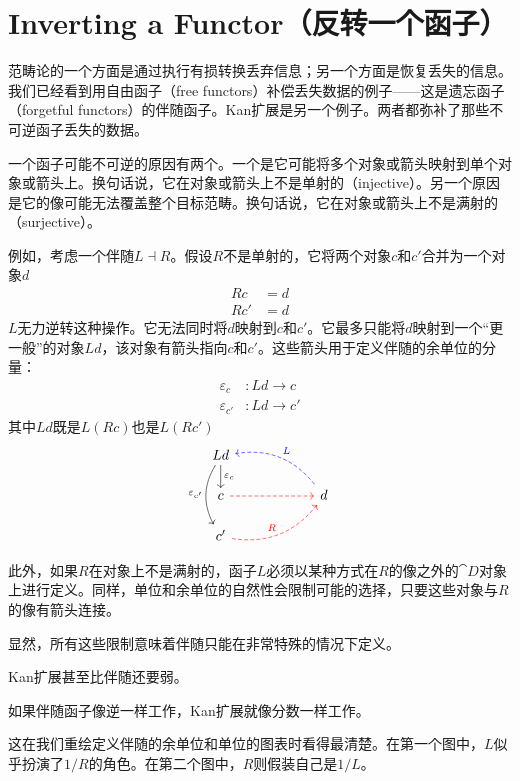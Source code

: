 \documentclass[DaoFP]{subfiles}
\begin{document}
 \section{Inverting a Functor（反转一个函子）}

 范畴论的一个方面是通过执行有损转换丢弃信息；另一个方面是恢复丢失的信息。我们已经看到用自由函子（free functors）补偿丢失数据的例子——这是遗忘函子（forgetful functors）的伴随函子。Kan扩展是另一个例子。两者都弥补了那些不可逆函子丢失的数据。

 一个函子可能不可逆的原因有两个。一个是它可能将多个对象或箭头映射到单个对象或箭头上。换句话说，它在对象或箭头上不是单射的（injective）。另一个原因是它的像可能无法覆盖整个目标范畴。换句话说，它在对象或箭头上不是满射的（surjective）。

 例如，考虑一个伴随$L \dashv R$。假设$R$不是单射的，它将两个对象$c$和$c'$合并为一个对象$d$
 \begin{align*}
  R c &= d \\
  R c' &= d
 \end{align*}
 $L$无力逆转这种操作。它无法同时将$d$映射到$c$和$c'$。它最多只能将$d$映射到一个“更一般”的对象$L d$，该对象有箭头指向$c$和$c'$。这些箭头用于定义伴随的余单位的分量：
 \begin{align*}
  \varepsilon_c &\colon L d \to c
  \\
  \varepsilon_{c'} &\colon L d \to c'
 \end{align*}
 其中$L d$既是$L (R c)$也是$L (R c')$
 \[
  \begin{tikzcd} [row sep=0.5cm, column sep=1cm]
   L d
   \arrow[d, "\varepsilon_c"]
   \arrow[dd, bend right, "\varepsilon_{c'}"']
   \\
   c
   \arrow[rr, red, dashed, ""]
   && d
   \arrow[ull, blue, bend right, dashed, "L"']
   \\
   c'
   \arrow[urr, red, bend right, dashed, "R"]
  \end{tikzcd}
 \]

 此外，如果$R$在对象上不是满射的，函子$L$必须以某种方式在$R$的像之外的$\cat D$对象上进行定义。同样，单位和余单位的自然性会限制可能的选择，只要这些对象与$R$的像有箭头连接。

 显然，所有这些限制意味着伴随只能在非常特殊的情况下定义。

 Kan扩展甚至比伴随还要弱。

 如果伴随函子像逆一样工作，Kan扩展就像分数一样工作。

 这在我们重绘定义伴随的余单位和单位的图表时看得最清楚。在第一个图中，$L$似乎扮演了$1/R$的角色。在第二个图中，$R$则假装自己是$1/L$。
\end{document}
